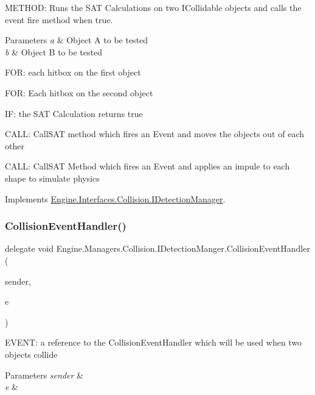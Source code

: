 M\+E\+T\+H\+OD\+: Runs the S\+AT Calculations on two I\+Collidable objects and calls the event fire method when true. 


\begin{DoxyParams}{Parameters}
{\em a} & Object A to be tested\\
\hline
{\em b} & Object B to be tested\\
\hline
\end{DoxyParams}
F\+OR\+: each hitbox on the first object

F\+OR\+: Each hitbox on the second object

IF\+: the S\+AT Calculation returns true

C\+A\+LL\+: Call\+S\+AT method which fires an Event and moves the objects out of each other

C\+A\+LL\+: Call\+S\+AT Method which fires an Event and applies an impule to each shape to simulate physics 

Implements \hyperlink{a00430_a1acd238daa104a8f4dcf36536e1ac9f9}{Engine.\+Interfaces.\+Collision.\+I\+Detection\+Manager}.

\mbox{\label{a00502_a7a0a94d84fd7588d01218d607e7b1d27}} 
\subsubsection{\texorpdfstring{Collision\+Event\+Handler()}{CollisionEventHandler()}}
{\footnotesize\ttfamily delegate void Engine.\+Managers.\+Collision.\+I\+Detection\+Manger.\+Collision\+Event\+Handler (\begin{DoxyParamCaption}\item[{object}]{sender,  }\item[{\hyperlink{a00350}{Collision\+Event\+Args}}]{e }\end{DoxyParamCaption})}



E\+V\+E\+NT\+: a reference to the Collision\+Event\+Handler which will be used when two objects collide 


\begin{DoxyParams}{Parameters}
{\em sender} & \\
\hline
{\em e} & \\
\hline
\end{DoxyParams}
\mbox{\label{a00502_a6785a08302cfe7d6fb08a7042691a3a8}} 
